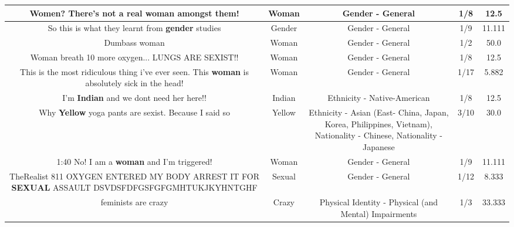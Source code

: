 \documentclass[11pt]{article}
\newlength\mylength
\begin{document}
\begin{center}
\begin{longtable}{|C{.65\mylength}|C{.30\mylength}|C{.12\mylength}|C{.12\mylength}|C{.12\mylength}|}
  \small Women? There's not a real \textbf{woman} amongst them!\normalsize   & Woman & Gender - General & 1/8 & 12.5 \\  \hline
  \small So this is what they learnt from \textbf{gender} studies\normalsize   & Gender & Gender - General & 1/9 & 11.111 \\  \hline
  \small Dumbass woman\normalsize   & Woman & Gender - General & 1/2 & 50.0 \\  \hline
  \small Woman breath 10 more oxygen... LUNGS ARE SEXIST!!\normalsize   & Woman & Gender - General & 1/8 & 12.5 \\  \hline
  \small This is the most ridiculous thing i've ever seen. This \textbf{woman} is absolutely sick in the head!\normalsize   & Woman & Gender - General & 1/17 & 5.882 \\  \hline
  \small I'm \textbf{Indian} and we dont need her here!!\normalsize   & Indian & Ethnicity - Native-American & 1/8 & 12.5 \\  \hline
  \small Why \textbf{Y\textbf{e\textbf{llow}}} yoga pants are sexist. Because I said so\normalsize   & Yellow & Ethnicity - Asian (East- China, Japan, Korea, Philippines, Vietnam), Nationality - Chinese, Nationality - Japanese & 3/10 & 30.0 \\  \hline
  \small 1:40 No! I am a \textbf{woman} and I'm triggered!\normalsize   & Woman & Gender - General & 1/9 & 11.111 \\  \hline
  \small TheRealist 811 OXYGEN ENTERED MY BODY ARREST IT FOR \textbf{SEXUAL} ASSAULT DSVDSFDFGSFGFGMHTUKJKYHNTGHF\normalsize   & Sexual & Gender - General & 1/12 & 8.333 \\  \hline
  \small feminists are crazy\normalsize   & Crazy & Physical Identity - Physical (and Mental) Impairments & 1/3 & 33.333 \\  \hline

\end{longtable}
\end{center}
\end{document}
